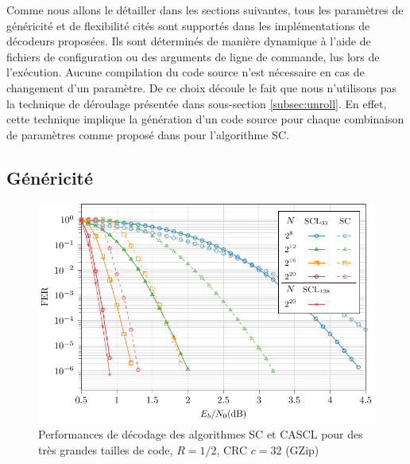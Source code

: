 Comme nous allons le détailler dans les sections suivantes, tous les paramètres de généricité et de flexibilité cités sont supportés dans les implémentations de décodeurs proposées. Ils sont déterminés de manière dynamique à l'aide de fichiers de configuration ou des arguments de ligne de commande, lus lors de l'exécution. Aucune compilation du code source n'est nécessaire en cas de changement d'un paramètre. De ce choix découle le fait que nous n'utilisons pas la technique de déroulage présentée dans sous-section \ref{subsec:unroll}. En effet, cette technique implique la génération d'un code source pour chaque combinaison de paramètres comme proposé dans \cite{sarkis_autogenerating_2014} pour l'algorithme SC.

\subsection{Généricité}

\begin{figure}[t]
\includegraphics[width=\textwidth]{main/ch2_fig/curves/code/tikz/code}
\caption{Performances de décodage des algorithmes SC et CASCL pour des très grandes tailles de code, $R=1/2$, CRC $c=32$ (GZip)}
\label{fig:large_scl}
\end{figure}

